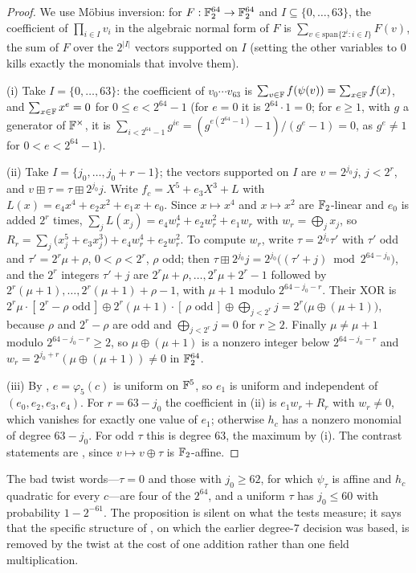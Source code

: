\begin{proof}
We use M\"obius inversion: for $F:\mathbb{F}_2^{64}\to\mathbb{F}_2^{64}$ and $I\subseteq\{0,\dots,63\}$,
the coefficient of $\prod_{i\in I}v_i$ in the algebraic normal form of $F$ is
$\sum_{v\in\mathrm{span}\{2^i:i\in I\}}F(v)$, the sum of $F$ over the
$2^{|I|}$ vectors supported on $I$ (setting the other variables to $0$ kills
exactly the monomials that involve them).

(i) Take $I=\{0,\dots,63\}$: the coefficient of $v_0\cdots v_{63}$ is
$\sum_{v\in\mathbb{F}}f(\psi(v))=\sum_{x\in\mathbb{F}}f(x)$, and
$\sum_{x\in\mathbb{F}}x^e=0$ for $0\le e<2^{64}-1$ (for $e=0$ it is $2^{64}\cdot1=0$;
for $e\ge1$, with $g$ a generator of $\mathbb{F}^\times$, it is
$\sum_{i<2^{64}-1}g^{ie}=(g^{e(2^{64}-1)}-1)/(g^e-1)=0$, as $g^e\ne1$ for $0<e<2^{64}-1$).

(ii) Take $I=\{j_0,\dots,j_0+r-1\}$; the vectors supported on $I$ are
$v=2^{j_0}j$, $j<2^r$, and $v\boxplus \tau=\tau\boxplus2^{j_0}j$.  Write
$f_c=X^5+e_3X^3+L$ with $L(x)=e_4x^4+e_2x^2+e_1x+e_0$.  Since $x\mapsto x^4$
and $x\mapsto x^2$ are $\mathbb{F}_2$-linear and $e_0$ is added $2^r$ times,
$\sum_jL(x_j)=e_4w_r^4+e_2w_r^2+e_1w_r$ with $w_r=\bigoplus_jx_j$, so
$R_r=\sum_j\bigl(x_j^5+e_3x_j^3\bigr)+e_4w_r^4+e_2w_r^2$.  To compute $w_r$,
write $\tau=2^{j_0}\tau'$ with $\tau'$ odd and $\tau'=2^r\mu+\rho$, $0<\rho<2^r$, $\rho$ odd; then
$\tau\boxplus2^{j_0}j=2^{j_0}\bigl((\tau'+j)\bmod2^{64-j_0}\bigr)$, and the $2^r$
integers $\tau'+j$ are $2^r\mu+\rho,\dots,2^r\mu+2^r-1$ followed by
$2^r(\mu+1),\dots,2^r(\mu+1)+\rho-1$, with $\mu+1$ modulo $2^{64-j_0-r}$.  Their XOR is
$2^r\mu\cdot[\,2^r-\rho\text{ odd}\,]\oplus2^r(\mu+1)\cdot[\,\rho\text{ odd}\,]\oplus\bigoplus_{j<2^r}j
=2^r\bigl(\mu\oplus(\mu+1)\bigr)$, because $\rho$ and $2^r-\rho$ are odd and
$\bigoplus_{j<2^r}j=0$ for $r\ge2$.  Finally $\mu\ne\mu+1$ modulo
$2^{64-j_0-r}\ge2$, so $\mu\oplus(\mu+1)$ is a nonzero integer below
$2^{64-j_0-r}$ and $w_r=2^{j_0+r}(\mu\oplus(\mu+1))\ne0$ in $\mathbb{F}_2^{64}$.

(iii) By , $e=\varphi_5(c)$ is uniform on $\mathbb{F}^5$, so
$e_1$ is uniform and independent of $(e_0,e_2,e_3,e_4)$.  For $r=63-j_0$ the
coefficient in (ii) is $e_1w_r+R_r$ with $w_r\ne0$, which vanishes for
exactly one value of $e_1$; otherwise $h_c$ has a nonzero monomial of degree
$63-j_0$.  For odd $\tau$ this is degree $63$, the maximum by (i).  The
contrast statements are , since $v\mapsto v\oplus \tau$
is $\mathbb{F}_2$-affine.
\end{proof}

The bad twist words---$\tau=0$ and those with $j_0\ge62$, for which $\psi_\tau$ is
affine and $h_c$ quadratic for every $c$---are four of the $2^{64}$, and a
uniform $\tau$ has $j_0\le60$ with probability $1-2^{-61}$.  The proposition
is silent on what the tests measure; it says that the specific structure of
, on which the earlier degree-$7$ decision was based,
is removed by the twist at the cost of one addition rather than one field
multiplication.

